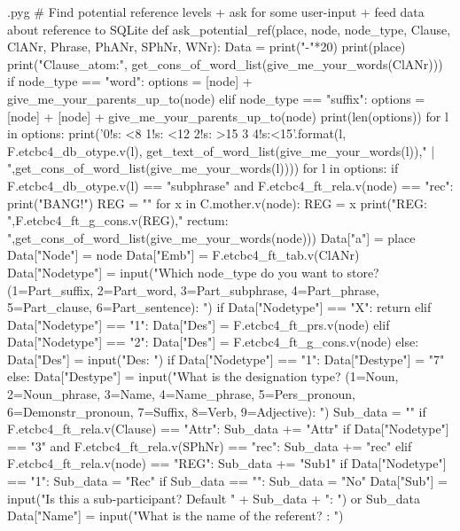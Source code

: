 \documentclass{report}
\makeatletter
\newenvironment{python}{%
  \VerbatimEnvironment
  \minted@resetoptions
  \setkeys{minted@opt}{}
      \begin{VerbatimOut}{\jobname.pyg}}
{%
      \end{VerbatimOut}
      \minted@pygmentize{python}
      \DeleteFile{\jobname.pyg}}
\makeatother
\begin{document}
\begin{python}
# Find potential reference levels + ask for some user-input + feed data about reference to SQLite
def ask_potential_ref(place, node, node_type, Clause, ClANr, Phrase, PhANr, SPhNr, WNr):
        Data = {}
        print("-"*20)
        print(place)
        print("Clause_atom:", get_cons_of_word_list(give_me_your_words(ClANr)))
        if node_type == "word":
            options = [node] + give_me_your_parents_up_to(node)
        elif node_type == "suffix":
            options = [node] + [node] + give_me_your_parents_up_to(node)
        print(len(options))
        for l in options:
            print('{0!s: <8} {1!s: <12} {2!s: >15} {3} {4!s:<15}'.format(l, F.etcbc4_db_otype.v(l), get_text_of_word_list(give_me_your_words(l))," | ",get_cons_of_word_list(give_me_your_words(l))))
        for l in options:
            if F.etcbc4_db_otype.v(l) == "subphrase" and F.etcbc4_ft_rela.v(node) == "rec":
                print("BANG!")
                REG = ""
                for x in C.mother.v(node):
                    REG = x
                print("REG: ",F.etcbc4_ft_g_cons.v(REG)," rectum: ",get_cons_of_word_list(give_me_your_words(node)))
        Data["a"] = place
        Data["Node"] = node
        Data["Emb"] = F.etcbc4_ft_tab.v(ClANr)
        Data["Nodetype"] = input("Which node_type do you want to store? (1=Part_suffix, 2=Part_word, 3=Part_subphrase, 4=Part_phrase, 5=Part_clause, 6=Part_sentence): ")
        if Data["Nodetype"] == "X":
            return
        elif Data["Nodetype"] == "1":
            Data["Des"] = F.etcbc4_ft_prs.v(node)
        elif Data["Nodetype"] == "2":
            Data["Des"] = F.etcbc4_ft_g_cons.v(node)
        else:
            Data["Des"] = input("Des: ")
        if Data["Nodetype"] == "1":
            Data["Destype"] = "7"
        else:
            Data["Destype"] = input("What is the designation type? (1=Noun, 2=Noun_phrase, 3=Name, 4=Name_phrase, 5=Pers_pronoun, 6=Demonstr_pronoun, 7=Suffix, 8=Verb, 9=Adjective): ")
        Sub_data = ""
        if F.etcbc4_ft_rela.v(Clause) == "Attr":
            Sub_data += "Attr"
        if Data["Nodetype"] == "3" and F.etcbc4_ft_rela.v(SPhNr) == "rec":
            Sub_data += "rec"
        elif F.etcbc4_ft_rela.v(node) == "REG":
            Sub_data += "Sub1"
        if Data["Nodetype"] == "1":
            Sub_data = "Rec"
        if Sub_data == "":
            Sub_data = "No"
        Data["Sub"] = input("Is this a sub-participant? Default " + Sub_data + ": ") or Sub_data
        Data["Name"] = input("What is the name of the referent? : ")

\end{python}
\end{document}

